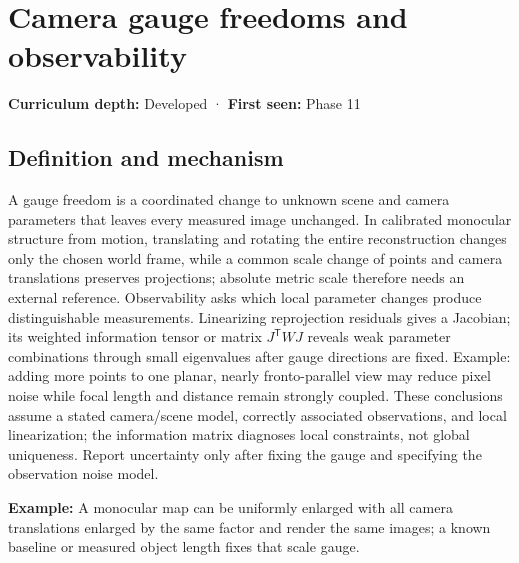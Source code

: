 \hypertarget{appendix-113f0267e5f4}{}\label{referencestart:appendix-113f0267e5f4}
\section{Camera gauge freedoms and observability}\label{appendix-113f0267e5f4-camera-gauge-freedoms-and-observability}

\hypertarget{appendix-113f0267e5f4-camera-gauge-freedoms-and-observability}{}

\textbf{Curriculum depth:} Developed · \textbf{First seen:} Phase 11

\begin{allmightroledefinition}

\subsection{Definition and mechanism}\label{appendix-113f0267e5f4-definition-and-mechanism}

\hypertarget{appendix-113f0267e5f4-definition-and-mechanism}{}

A gauge freedom is a coordinated change to unknown scene and camera parameters that leaves every measured image unchanged. In calibrated monocular structure from motion, translating and rotating the entire reconstruction changes only the chosen world frame, while a common scale change of points and camera translations preserves projections; absolute metric scale therefore needs an external reference. Observability asks which local parameter changes produce distinguishable measurements. Linearizing reprojection residuals gives a Jacobian; its weighted information tensor or matrix \(J^{\mathsf T}WJ\) reveals weak parameter combinations through small eigenvalues after gauge directions are fixed. Example: adding more points to one planar, nearly fronto-parallel view may reduce pixel noise while focal length and distance remain strongly coupled. These conclusions assume a stated camera/scene model, correctly associated observations, and local linearization; the information matrix diagnoses local constraints, not global uniqueness. Report uncertainty only after fixing the gauge and specifying the observation noise model.

\end{allmightroledefinition}

\textbf{Example:} A monocular map can be uniformly enlarged with all camera translations enlarged by the same factor and render the same images; a known baseline or measured object length fixes that scale gauge.

